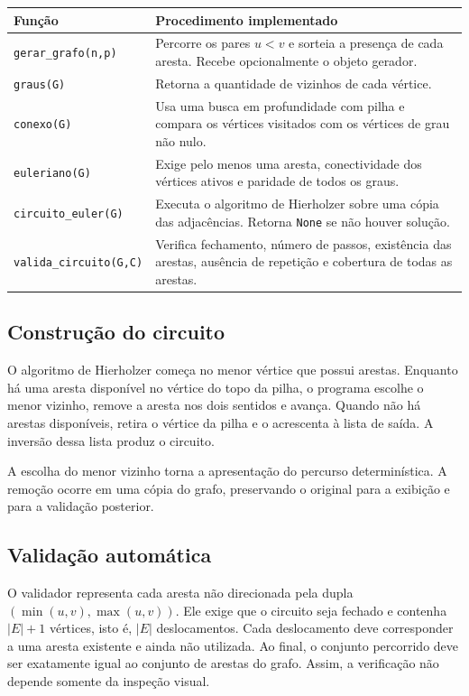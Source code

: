 \documentclass[11pt,a4paper]{article}
\newcommand{\funcao}[1]{\texttt{#1}}
\begin{document}
\begin{center}
\small
\begin{tabularx}{\textwidth}{@{}p{4.15cm}Y@{}}
\toprule
Função & Procedimento implementado \\
\midrule
\funcao{gerar\_grafo(n,p)} & Percorre os pares $u<v$ e sorteia a presença de cada aresta. Recebe opcionalmente o objeto gerador. \\
\addlinespace[3pt]
\funcao{graus(G)} & Retorna a quantidade de vizinhos de cada vértice. \\
\addlinespace[3pt]
\funcao{conexo(G)} & Usa uma busca em profundidade com pilha e compara os vértices visitados com os vértices de grau não nulo. \\
\addlinespace[3pt]
\funcao{euleriano(G)} & Exige pelo menos uma aresta, conectividade dos vértices ativos e paridade de todos os graus. \\
\addlinespace[3pt]
\funcao{circuito\_euler(G)} & Executa o algoritmo de Hierholzer sobre uma cópia das adjacências. Retorna \funcao{None} se não houver solução. \\
\addlinespace[3pt]
\funcao{valida\_circuito(G,C)} & Verifica fechamento, número de passos, existência das arestas, ausência de repetição e cobertura de todas as arestas. \\
\bottomrule
\end{tabularx}
\end{center}

\subsection{Construção do circuito}

O algoritmo de Hierholzer começa no menor vértice que possui arestas.
Enquanto há uma aresta disponível no vértice do topo da pilha, o programa
escolhe o menor vizinho, remove a aresta nos dois sentidos e avança. Quando
não há arestas disponíveis, retira o vértice da pilha e o acrescenta à
lista de saída. A inversão dessa lista produz o circuito.

A escolha do menor vizinho torna a apresentação do percurso determinística.
A remoção ocorre em uma cópia do grafo, preservando o original para a
exibição e para a validação posterior.

\subsection{Validação automática}

O validador representa cada aresta não direcionada pela dupla
$(\min(u,v),\max(u,v))$. Ele exige que o circuito seja fechado e contenha
$|E|+1$ vértices, isto é, $|E|$ deslocamentos. Cada deslocamento deve
corresponder a uma aresta existente e ainda não utilizada. Ao final,
o conjunto percorrido deve ser exatamente igual ao conjunto de arestas
do grafo. Assim, a verificação não depende somente da inspeção visual.
\end{document}
